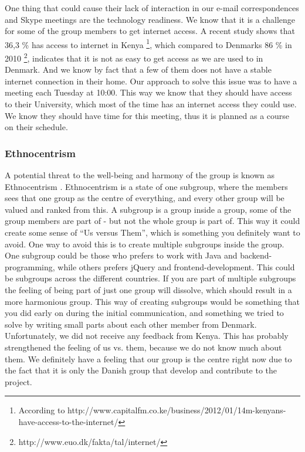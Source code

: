 One thing that could cause their lack of interaction in our e-mail correspondences and Skype meetings are the technology readiness. We know that it is a challenge for some of the group members to get internet access. A recent study shows that 36,3 \% has access to internet in Kenya \footnote{According to http://www.capitalfm.co.ke/business/2012/01/14m-kenyans-have-access-to-the-internet/}, which compared to Denmarks 86 \% in 2010 \footnote{http://www.euo.dk/fakta/tal/internet/}, indicates that it is not as easy to get access as we are used to in Denmark. And we know by fact that a few of them does not have a stable internet connection in their home. Our approach to solve this issue was to have a meeting each Tuesday at 10:00. This way we know that they should have access to their University, which most of the time has an internet access they could use. We know they should have time for this meeting, thus it is planned as a course on their schedule.

\subsubsection{Ethnocentrism} \label{subsubsec:ethnocentrism}
A potential threat to the well-being and harmony of the group is known as Ethnocentrism \cite{durnell2004subgroup}. Ethnocentrism is a state of one subgroup, where the members sees that one group as the centre of everything, and every other group will be valued and ranked from this. A subgroup is a group inside a group, some of the group members are part of - but not the whole group is part of. This way it could create some sense of ``Us versus Them'', which is something you definitely want to avoid. One way to avoid this is to create multiple subgroups inside the group. One subgroup could be those who prefers to work with Java and backend-programming, while others prefers jQuery and frontend-development. This could be subgroups across the different countries. If you are part of multiple subgroups the feeling of being part of just one group will dissolve, which should result in a more harmonious group.
This way of creating subgroups would be something that you did early on during the initial communication, and something we tried to solve by writing small parts about each other member from Denmark. Unfortunately, we did not receive any feedback from Kenya. This has probably strengthened the feeling of us vs. them, because we do not know much about them. We definitely have a feeling that our group is the centre right now due to the fact that it is only the Danish group that develop and contribute to the project.

